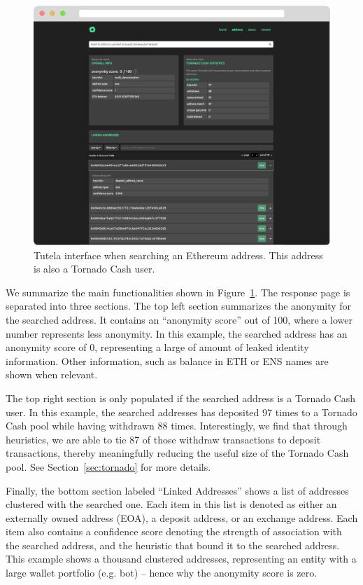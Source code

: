 \documentclass[11pt,a4paper]{article}
\begin{document}
\begin{figure}[h!]
\includegraphics[width=\linewidth]{figures/demo.pdf}
\caption{Tutela interface when searching an Ethereum address. This address is also a Tornado Cash user.}
\label{fig:demo}
\end{figure}

We summarize the main functionalities shown in Figure~\ref{fig:demo}. The response page is separated into three sections. The top left section summarizes the anonymity for the searched address. It contains an ``anonymity score'' out of 100, where a lower number represents less anonymity. In this example, the searched address has an anonymity score of 0, representing a large of amount of leaked identity information. Other information, such as balance in ETH or ENS names are shown when relevant.

The top right section is only populated if the searched address is a Tornado Cash user. In this example, the searched addresses has deposited 97 times to a Tornado Cash pool while having withdrawn 88 times. Interestingly, we find that through heuristics, we are able to tie 87 of those withdraw transactions to deposit transactions, thereby meaningfully reducing the useful size of the Tornado Cash pool. See Section~\ref{sec:tornado} for more details.

Finally, the bottom section labeled ``Linked Addresses'' shows a list of addresses clustered with the searched one. Each item in this list is denoted as either an externally owned address (EOA), a deposit address, or an exchange address. Each item also contains a confidence score denoting the strength of association with the searched address, and the heuristic that bound it to the searched address.
This example shows a thousand clustered addresses, representing an entity with a large wallet portfolio (e.g. bot) -- hence why the anonymity score is zero.
\end{document}
